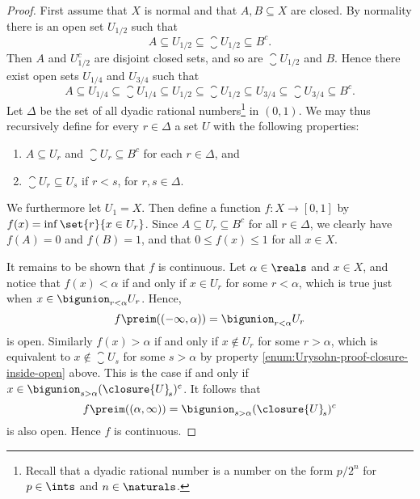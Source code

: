 \documentclass[article, a4paper, 11pt, oneside]{memoir}
\numberwithin{equation}{chapter}
\begin{document}
\begin{proof}
    First assume that $X$ is normal and that $A,B \subseteq X$ are closed. By normality there is an open set $U_{1/2}$ such that
    \begin{equation*}
        A
            \subseteq U_{1/2}
            \subseteq \closure{U}_{\!1/2}
            \subseteq B^c.
    \end{equation*}
    Then $A$ and $U_{1/2}^c$ are disjoint closed sets, and so are $\closure{U}_{\!1/2}$ and $B$. Hence there exist open sets $U_{1/4}$ and $U_{3/4}$ such that
    \begin{equation*}
        A
            \subseteq U_{1/4}
            \subseteq \closure{U}_{\!1/4}
            \subseteq U_{1/2}
            \subseteq \closure{U}_{\!1/2}
            \subseteq U_{3/4}
            \subseteq \closure{U}_{\!3/4}
            \subseteq B^c.
    \end{equation*}
    Let $\Delta$ be the set of all dyadic rational numbers\footnote{Recall that a dyadic rational number is a number on the form $p/2^n$ for $p \in \ints$ and $n \in \naturals$.} in $(0,1)$. We may thus recursively define for every $r \in \Delta$ a set $U$ with the following properties:
    \begin{enumerate} %
        \item $A \subseteq U_r$ and $\closure{U}_{\!r} \subseteq B^c$ for each $r \in \Delta$, and

        \item \label{enum:Urysohn-proof-closure-inside-open} $\closure{U}_{\!r} \subseteq U_s$ if $r < s$, for $r,s \in \Delta$.
    \end{enumerate}
    We furthermore let $U_1 = X$. Then define a function $f \colon X \to [0,1]$ by $f(x) = \inf \set{r}{x \in U_r}$. Since $A \subseteq U_r \subseteq B^c$ for all $r \in \Delta$, we clearly have $f(A) = 0$ and $f(B) = 1$, and that $0 \leq f(x) \leq 1$ for all $x \in X$.

    It remains to be shown that $f$ is continuous. Let $\alpha \in \reals$ and $x \in X$, and notice that $f(x) < \alpha$ if and only if $x \in U_r$ for some $r < \alpha$, which is true just when $x \in \bigunion_{r < \alpha} U_r$. Hence,
    \begin{equation*}
        f\preim((-\infty,\alpha))
            = \bigunion_{r < \alpha} U_r
    \end{equation*}
    is open. Similarly $f(x) > \alpha$ if and only if $x \not\in U_r$ for some $r > \alpha$, which is equivalent to $x \not\in \closure{U}_{\!s}$ for some $s > \alpha$ by property \cref{enum:Urysohn-proof-closure-inside-open} above. This is the case if and only if $x \in \bigunion_{s > \alpha} (\closure{U}_{\!s})^c$. It follows that
    \begin{equation*}
        f\preim((\alpha,\infty))
            = \bigunion_{s > \alpha} (\closure{U}_{\!s})^c
    \end{equation*}
    is also open. Hence $f$ is continuous.


\end{proof}
\end{document}
